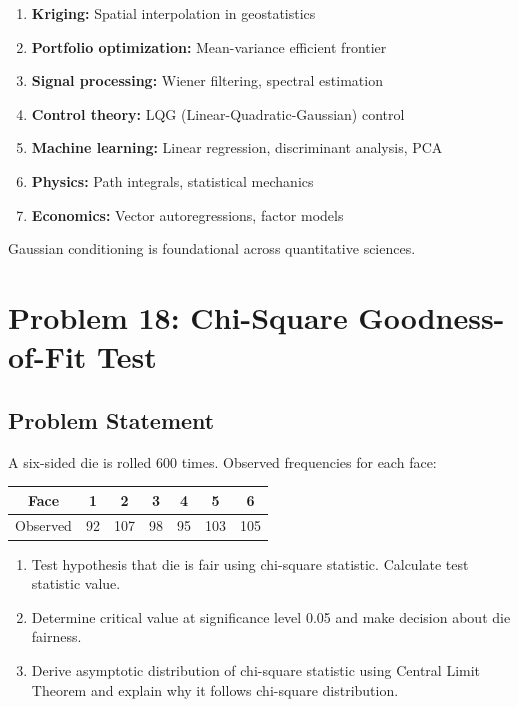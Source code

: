 \documentclass[12pt]{article}
\begin{document}
\begin{explanation}
\begin{enumerate}
    \item \textbf{Kriging:} Spatial interpolation in geostatistics
    \item \textbf{Portfolio optimization:} Mean-variance efficient frontier
    \item \textbf{Signal processing:} Wiener filtering, spectral estimation
    \item \textbf{Control theory:} LQG (Linear-Quadratic-Gaussian) control
    \item \textbf{Machine learning:} Linear regression, discriminant analysis, PCA
    \item \textbf{Physics:} Path integrals, statistical mechanics
    \item \textbf{Economics:} Vector autoregressions, factor models
\end{enumerate}

Gaussian conditioning is foundational across quantitative sciences.

\end{explanation}

\newpage
\section{Problem 18: Chi-Square Goodness-of-Fit Test}

\subsection{Problem Statement}

A six-sided die is rolled 600 times. Observed frequencies for each face:

\begin{center}
\begin{tabular}{c|cccccc}
Face & 1 & 2 & 3 & 4 & 5 & 6 \\
\hline
Observed & 92 & 107 & 98 & 95 & 103 & 105 \\
\end{tabular}
\end{center}

\begin{enumerate}
\item[(a)] Test hypothesis that die is fair using chi-square statistic. Calculate test statistic value.
\item[(b)] Determine critical value at significance level 0.05 and make decision about die fairness.
\item[(c)] Derive asymptotic distribution of chi-square statistic using Central Limit Theorem and explain why it follows chi-square distribution.
\end{enumerate}
\end{document}
